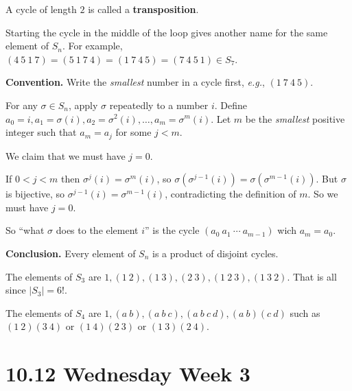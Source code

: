 \documentclass{notes}
\begin{document}
\begin{rmk}
  A cycle of length $2$ is called a {\boldmath \bfseries transposition}.
\end{rmk}

\begin{rmk}
  Starting the cycle in the middle of the loop gives another name for the same element of $S_n$.
  For example, $(4\ 5\ 1\ 7) = (5\ 1\ 7\ 4) = (1\ 7\ 4\ 5) = (7\ 4\ 5\ 1) \in S_7$.
\end{rmk}

{\boldmath \bfseries Convention.} Write the \textit{smallest} number in a cycle first, \textit{e.g.}, $(1\ 7\ 4\ 5)$.

For any $\sigma \in S_n$, apply $\sigma$ repeatedly to a number $i$.
Define $a_0 = i, a_1 = \sigma(i), a_2 = \sigma^2(i), \dots, a_m = \sigma^m(i)$.
Let $m$ be the \textit{smallest} positive integer such that $a_m = a_j$ for some $j < m$.

We claim that we must have $j = 0$.

\begin{prf}
  If $0 < j < m$ then $\sigma^j(i) = \sigma^m(i)$, so $\sigma(\sigma^{j - 1}(i)) = \sigma(\sigma^{m - 1}(i))$.
  But $\sigma$ is bijective, so $\sigma^{j - 1}(i) = \sigma^{m - 1}(i)$, contradicting the definition of $m$.
  So we must have $j = 0$.

  So ``what $\sigma$ does to the element $i$'' is the cycle $(a_0\ a_1\ \cdots\ a_{m - 1})$ wich $a_m = a_0$.
\end{prf}

{\boldmath \bfseries Conclusion.} Every element of $S_n$ is a product of disjoint cycles.

\begin{eg}
  The elements of $S_3$ are $1, (1\ 2), (1\ 3), (2\ 3), (1\ 2\ 3), (1\ 3\ 2)$.
  That is all since $\left | S_3 \right | = 6!$.
\end{eg}

\begin{eg}
  The elements of $S_4$ are $1, (a\ b), (a\ b\ c), (a\ b\ c\ d), (a\ b) (c\ d)$ such as $(1\ 2) (3\ 4)$ or $(1\ 4) (2\ 3)$ or $(1\ 3) (2\ 4)$.
\end{eg}

\newpage

\section{10.12 Wednesday Week 3}

\underline{}
\end{document}
